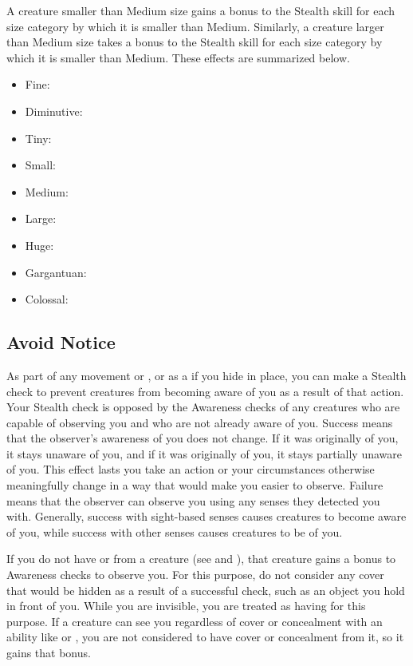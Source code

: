         \label{Size and Stealth} A creature smaller than Medium size gains a  bonus to the Stealth skill for each size category by which it is smaller than Medium.
        Similarly, a creature larger than Medium size takes a  bonus to the Stealth skill for each size category by which it is smaller than Medium.
        These effects are summarized below.
            \begin{itemize}
                \item Fine: 
                \item Diminutive: 
                \item Tiny: 
                \item Small: 
                \item Medium: 
                \item Large: 
                \item Huge: 
                \item Gargantuan: 
                \item Colossal: 
            \end{itemize}

    \subsection{Avoid Notice}
        As part of any movement or , or as a  if you hide in place, you can make a Stealth check to prevent creatures from becoming aware of you as a result of that action.
        Your Stealth check is opposed by the Awareness checks of any creatures who are capable of observing you and who are not already aware of you.
        Success means that the observer's awareness of you does not change.
        If it was originally \unaware of you, it stays unaware of you, and if it was originally \partiallyunaware of you, it stays partially unaware of you.
        This effect lasts you take an action or your circumstances otherwise meaningfully change in a way that would make you easier to observe.
        Failure means that the observer can observe you using any senses they detected you with.
        Generally, success with sight-based senses causes creatures to become aware of you, while success with other senses causes creatures to be \partiallyunaware of you.

        If you do not have  or  from a creature (see  and ), that creature gains a  bonus to Awareness checks to observe you.
        For this purpose, do not consider any cover that would be hidden as a result of a successful check, such as an object you hold in front of you.
        While you are invisible, you are treated as having  for this purpose.
        If a creature can see you regardless of cover or concealment with an ability like  or , you are not considered to have cover or concealment from it, so it gains that  bonus.


